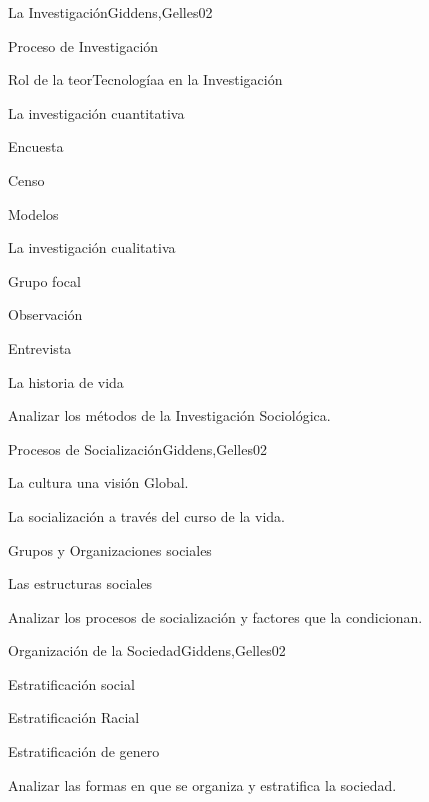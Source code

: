 \begin{syllabus}
\begin{unit}{La Investigación}{Giddens,Gelles}{0}{2}
    \begin{topics}
      \item Proceso de Investigación
      \item Rol de la teorTecnologíaa en la Investigación
      \item La investigación cuantitativa
      \item Encuesta
      \item Censo
      \item Modelos
      \item La investigación cualitativa
      \item Grupo focal
      \item Observación
      \item Entrevista
      \item La historia de vida
    \end{topics}
    \begin{learningoutcomes}
      \item Analizar los métodos de la Investigación Sociológica.
    \end{learningoutcomes}
\end{unit}

\begin{unit}{Procesos de Socialización}{Giddens,Gelles}{0}{2}
    \begin{topics}
      \item La cultura una visión Global.
      \item La socialización a través del curso de la vida.
      \item Grupos y Organizaciones sociales
      \item Las estructuras sociales
    \end{topics}
    \begin{learningoutcomes}
      \item Analizar los procesos de socialización y factores que la condicionan.
    \end{learningoutcomes}
\end{unit}

\begin{unit}{Organización de la Sociedad}{Giddens,Gelles}{0}{2}
    \begin{topics}
      \item Estratificación social
      \item Estratificación Racial
      \item Estratificación de genero
    \end{topics}
    \begin{learningoutcomes}
      \item Analizar las formas en que se organiza y estratifica la sociedad.
    \end{learningoutcomes}
\end{unit}


\end{syllabus}

